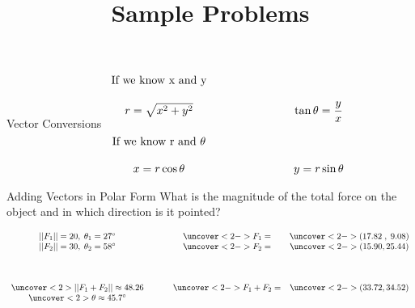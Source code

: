 \documentclass[11pt,xcolor=dvipsnames]{beamer}
\date[mm]
\title[Sample Problems] {Sample Problems}
\begin{document}
\begin{frame}
	\titlepage
\end{frame}

\begin{frame}{Vector Conversions}
$
\begin{array}{ccc}
{\text {If we know x and y}}&&\\
&&\\
r = \sqrt{x^2+y^2}&\hskip 2 cm&\tan \theta = \displaystyle{\frac{y}{x}} \\
&&\\
{\text {If we know r and }}\theta &&\\
&&\\
x=r \cos \theta&&y=r \sin \theta \\
\end{array}
$

\end{frame}

\begin{frame}{Adding Vectors in Polar Form} 		%
What is the magnitude of the total force on the object and in which direction is it pointed?

\bigskip

$
\begin{array}{cccc}
||F_1|| = 20, \; \theta_1 = 27^\circ &\hskip 0.5 cm&\uncover<2->{F_1 =} &\uncover<2->{(17.82 \; , \; 9.08)}\\
||F_2|| = 30, \; \theta_2 = 58^\circ&&\uncover<2->{F_2 =}  &\uncover<2->{(15.90,25.44)} \\
&&& \\
&&& \\
&&& \\
\uncover<2>{||F_1+F_2|| \approx 48.26}&&\uncover<2->{F_1 + F_2 =}&\uncover<2->{(33.72,34.52)} \\
\uncover<2>{\theta \approx 45.7^\circ}&&&\\
\end{array}
$

\end{frame}
\end{document}
